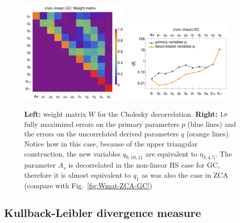 \begin{figure}[htbp]
	\centering 
	\includegraphics[width=0.47\textwidth]{Chapters/linear-nonlinear-MG-forecasts/figures/Decorrelations-GC/Weight_Matrix_Cholesky_SquareNorm--_fiducialMGBin3_Euclid_GC_nonlinearPk__Zhao_.pdf}
	\includegraphics[width=0.47\textwidth]{Chapters/linear-nonlinear-MG-forecasts/figures/Decorrelations-GC/Errors_at_par_index_i--_Cholesky_SquareNorm--fiducialMGBin3_Euclid_GC_nonlinearPk__Zhao_.pdf}
	\caption[Cholesky decorrelation: Weight matrix and uncorrelated errors.]{\textbf{Left:} weight matrix $W$ for the Cholesky decorrelation. \textbf{Right:} 1$\sigma$ fully maximized errors on
		the primary parameters $p$ (blue lines) and the errors on the uncorrelated
		derived parameters $q$ (orange lines). Notice how in this case, because of the upper triangular construction, the new variables
		$q_{9,10,11}$ are equivalent to $\eta_{3,4,5}$. The parameter $A_s$ is decorrelated in the non-linear HS case for GC, therefore
		it is almost equivalent to $q_1$ as was also the case in ZCA (compare with Fig.\ \ref{fig:Wmat-ZCA-GC})
	}\label{fig:Chol-GCnlhs}
\end{figure}


\subsection{Kullback-Leibler divergence measure \label{sub:KL-matrices-MGBin}}

